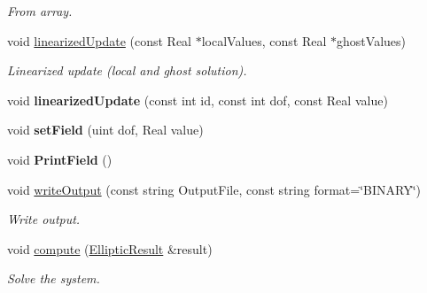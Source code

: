 \begin{DoxyCompactItemize}
\begin{DoxyCompactList}\small\item\em From array. \item\end{DoxyCompactList}\item 
\hypertarget{classvoom_1_1_poisson_model_a092fb6b43a79418df497d1500beb49f0}{
void \hyperlink{classvoom_1_1_poisson_model_a092fb6b43a79418df497d1500beb49f0}{linearizedUpdate} (const Real $\ast$localValues, const Real $\ast$ghostValues)}
\label{classvoom_1_1_poisson_model_a092fb6b43a79418df497d1500beb49f0}

\begin{DoxyCompactList}\small\item\em Linearized update (local and ghost solution). \item\end{DoxyCompactList}\item 
\hypertarget{classvoom_1_1_poisson_model_a87b6ce39234402175a8e013195fd67b7}{
void {\bfseries linearizedUpdate} (const int id, const int dof, const Real value)}
\label{classvoom_1_1_poisson_model_a87b6ce39234402175a8e013195fd67b7}

\item 
\hypertarget{classvoom_1_1_poisson_model_ad2c5fd263fd83a5f658795d015b61ffb}{
void {\bfseries setField} (uint dof, Real value)}
\label{classvoom_1_1_poisson_model_ad2c5fd263fd83a5f658795d015b61ffb}

\item 
\hypertarget{classvoom_1_1_poisson_model_a9b691b10ceb50f16e41dd3aef9a2f018}{
void {\bfseries PrintField} ()}
\label{classvoom_1_1_poisson_model_a9b691b10ceb50f16e41dd3aef9a2f018}

\item 
\hypertarget{classvoom_1_1_poisson_model_a66e9190970d630ca289a1afdcfbc8aee}{
void \hyperlink{classvoom_1_1_poisson_model_a66e9190970d630ca289a1afdcfbc8aee}{writeOutput} (const string OutputFile, const string format=\char`\"{}BINARY\char`\"{})}
\label{classvoom_1_1_poisson_model_a66e9190970d630ca289a1afdcfbc8aee}

\begin{DoxyCompactList}\small\item\em Write output. \item\end{DoxyCompactList}\item 
\hypertarget{classvoom_1_1_poisson_model_abebe125119aedfef8e067e1ef35dae57}{
void \hyperlink{classvoom_1_1_poisson_model_abebe125119aedfef8e067e1ef35dae57}{compute} (\hyperlink{structvoom_1_1_elliptic_result}{EllipticResult} \&result)}
\label{classvoom_1_1_poisson_model_abebe125119aedfef8e067e1ef35dae57}

\begin{DoxyCompactList}\small\item\em Solve the system. \item\end{DoxyCompactList}\end{DoxyCompactItemize}

